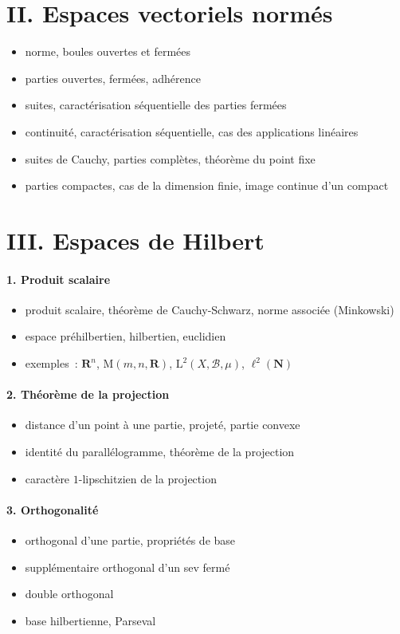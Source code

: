 \documentclass[11pt,a4paper]{article}
\def\N{\mathbf{N}}
\def\R{\mathbf{R}}
\def\L{\mathrm{L}}
\def\M{\mathrm{M}}
\theoremstyle{plain}
\theoremstyle{definition}
\begin{document}
\section*{II. Espaces vectoriels norm\'es}
\begin{itemize}
\item norme, boules ouvertes et ferm\'ees
\item parties ouvertes, ferm\'ees, adh\'erence
\item suites, caract\'erisation s\'equentielle des parties ferm\'ees
\item continuit\'e, caract\'erisation s\'equentielle, cas des applications lin\'eaires
\item suites de Cauchy, parties compl\`etes, th\'eor\`eme du point fixe
\item parties compactes, cas de la dimension finie, image continue d'un compact
\end{itemize}

\section*{III. Espaces de Hilbert}
\paragraph{1. Produit scalaire}
\begin{itemize}
  \item produit scalaire, th\'eor\`eme de Cauchy-Schwarz, norme associ\'ee
  (Min\-kow\-ski)
  \item espace pr\'ehilbertien, hilbertien, euclidien
  \item exemples~: $\R^n$, $\M(m,n,\R)$, $\L^2(X,\mathscr{B},\mu)$, $\ell^2(\N)$
\end{itemize}

\paragraph{2. Th\'eor\`eme de la projection}
\begin{itemize}
  \item distance d'un point \`a une partie, projet\'e, partie convexe
  \item identit\'e du parall\'elogramme, th\'eor\`eme de la projection
  \item caract\`ere $1$-lipschitzien de la projection
\end{itemize}

\paragraph{3. Orthogonalit\'e}
\begin{itemize}
  \item orthogonal d'une partie, propri\'et\'es de base
  \item suppl\'ementaire orthogonal d'un sev ferm\'e
  \item double orthogonal
  \item base hilbertienne, Parseval
\end{itemize}
\end{document}
